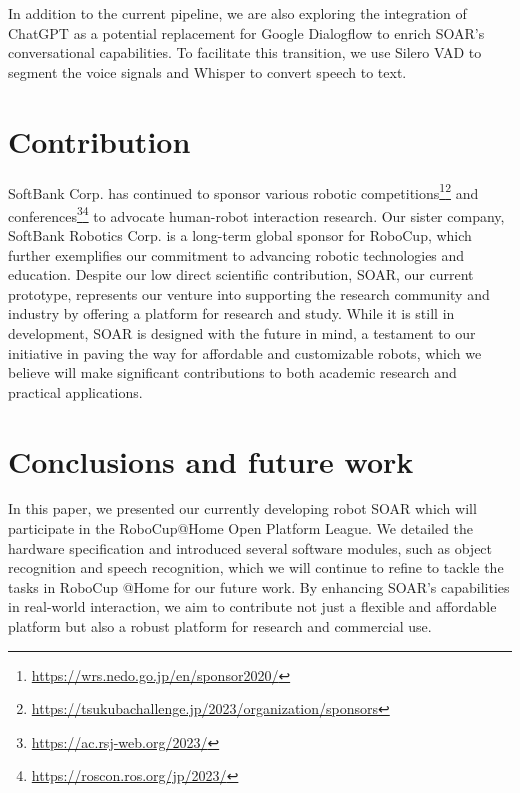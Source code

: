 \documentclass[runningheads,a4paper]{llncs}
\begin{document}
In addition to the current pipeline, we are also exploring the integration of ChatGPT\cite{openai2023gpt4} as a potential replacement for Google Dialogflow to enrich SOAR’s conversational capabilities.
To facilitate this transition, we use Silero VAD\cite{SileroVAD} to segment the voice signals and Whisper\cite{radford2022robust} to convert speech to text.


\section{Contribution}
SoftBank Corp. has continued to sponsor various robotic competitions\footnote{\url{https://wrs.nedo.go.jp/en/sponsor2020/}}\footnote{\url{https://tsukubachallenge.jp/2023/organization/sponsors}} and conferences\footnote{\url{https://ac.rsj-web.org/2023/}}\footnote{\url{https://roscon.ros.org/jp/2023/}} to advocate human-robot interaction research.
Our sister company, SoftBank Robotics Corp. is a long-term global sponsor for RoboCup, which further exemplifies our commitment to advancing robotic technologies and education.
Despite our low direct scientific contribution, SOAR, our current prototype, represents our venture into supporting the research community and industry by offering a platform for research and study.
While it is still in development, SOAR is designed with the future in mind, a testament to our initiative in paving the way for affordable and customizable robots, which we believe will make significant contributions to both academic research and practical applications.

\section{Conclusions and future work}
In this paper, we presented our currently developing robot SOAR which will participate in the RoboCup@Home Open Platform League.
We detailed the hardware specification and introduced several software modules, such as object recognition and speech recognition, which we will continue to refine to tackle the tasks in RoboCup @Home for our future work.
By enhancing SOAR’s capabilities in real-world interaction, we aim to contribute not just a flexible and affordable platform but also a robust platform for research and commercial use.


%
%




\clearpage{}

%
%

\robospecs{}


\nocite{*}
\end{document}
